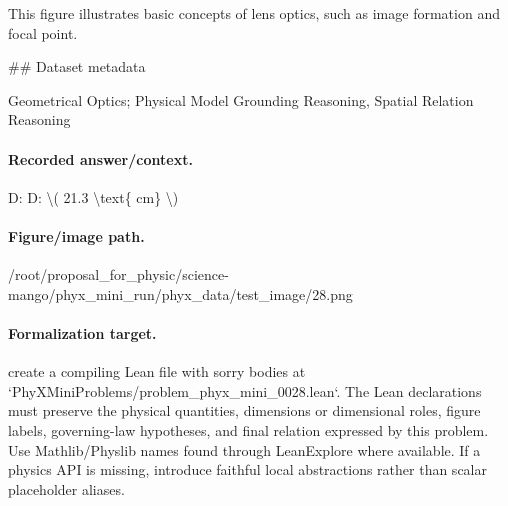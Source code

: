 This figure illustrates basic concepts of lens optics, such as image formation and focal point.

\#\# Dataset metadata

Geometrical Optics; Physical Model Grounding Reasoning, Spatial Relation Reasoning

\paragraph{Recorded answer/context.}
D: D: \textbackslash{}( 21.3 \textbackslash{}text\{ cm\} \textbackslash{})

\paragraph{Figure/image path.}
/root/proposal\_for\_physic/science-mango/phyx\_mini\_run/phyx\_data/test\_image/28.png

\paragraph{Formalization target.}
create a compiling Lean file with sorry bodies at `PhyXMiniProblems/problem\_phyx\_mini\_0028.lean`. The Lean declarations must preserve the physical quantities, dimensions or dimensional roles, figure labels, governing-law hypotheses, and final relation expressed by this problem.
Use Mathlib/Physlib names found through LeanExplore where available. If a physics API is missing, introduce faithful local abstractions rather than scalar placeholder aliases.

